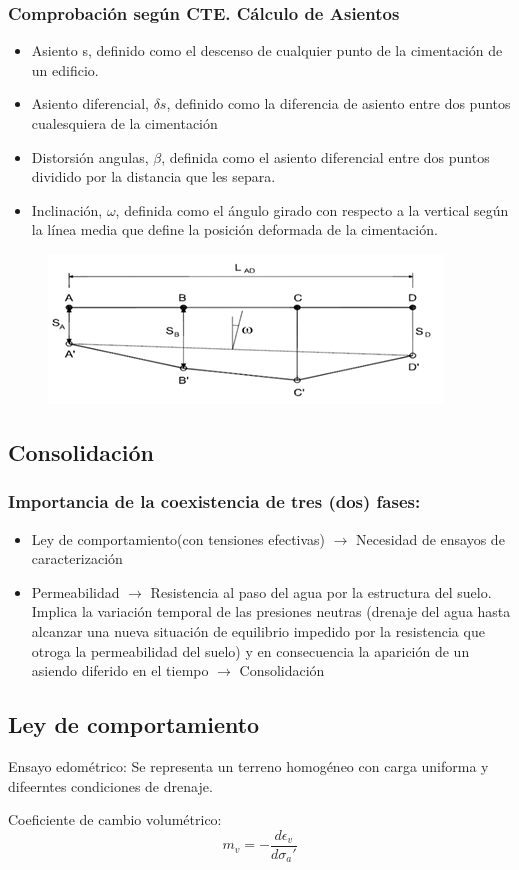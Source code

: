 \subsubsection{Comprobación según CTE. Cálculo de Asientos}
\begin{itemize}
    \item Asiento s, definido como el descenso de cualquier punto de la cimentación de un edificio.
    \item Asiento diferencial, $\delta s$, definido como la diferencia de asiento entre dos puntos cualesquiera de la cimentación
    \item Distorsión angulas, $\beta$, definida como el asiento diferencial entre dos puntos dividido por la distancia que les separa.
    \item Inclinación, $\omega$, definida como el ángulo girado con respecto a la vertical según la línea media que define la posición deformada de la cimentación.
\end{itemize}

\begin{figure}[H]
    \centering
    \includegraphics[width = 0.5 \textwidth]{Imagenes/Suelos Calculo de Asientos.png}
\end{figure}

\subsection{Consolidación}
\subsubsection{Importancia de la coexistencia de tres (dos) fases:}
\begin{itemize}
    \item Ley  de comportamiento(con tensiones efectivas) $\rightarrow$ Necesidad de ensayos de caracterización
    \item Permeabilidad $\rightarrow$ Resistencia al paso del agua por la estructura del suelo. Implica la variación temporal de las presiones neutras (drenaje del agua hasta alcanzar una nueva situación de equilibrio impedido por la resistencia que otroga la permeabilidad del suelo) y en consecuencia la aparición de un asiendo diferido en el tiempo $\rightarrow$ Consolidación
\end{itemize}

\subsection{Ley de comportamiento}
Ensayo edométrico: Se representa un terreno homogéneo con carga uniforma y difeerntes condiciones de drenaje.

Coeficiente de cambio volumétrico:
\[m_v = - \frac{d \epsilon_v}{d \sigma_a'}\]

